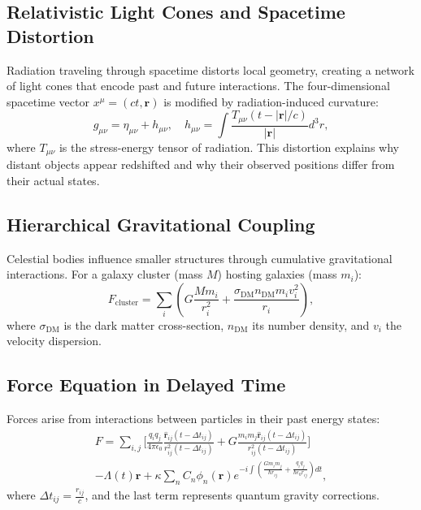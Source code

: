 \documentclass[12pt, a4paper]{article}
\begin{document}
\subsection{Relativistic Light Cones and Spacetime Distortion}
Radiation traveling through spacetime distorts local geometry, creating a network of light cones that encode past and future interactions. The four-dimensional spacetime vector \( x^\mu = (ct, \bm{r}) \) is modified by radiation-induced curvature:
\begin{equation}
g_{\mu\nu} = \eta_{\mu\nu} + h_{\mu\nu}, \quad h_{\mu\nu} = \int \frac{T_{\mu\nu}(t - |\bm{r}|/c)}{|\bm{r}|} d^3r, \label{eq:metric_pert}
\end{equation}
where \( T_{\mu\nu} \) is the stress-energy tensor of radiation. This distortion explains why distant objects appear redshifted and why their observed positions differ from their actual states.

\subsection{Hierarchical Gravitational Coupling}
Celestial bodies influence smaller structures through cumulative gravitational interactions. For a galaxy cluster (mass \( M \)) hosting galaxies (mass \( m_i \)):
\begin{equation}
F_{\text{cluster}} = \sum_i \left( G \frac{M m_i}{r_i^2} + \frac{\sigma_{\text{DM}} n_{\text{DM}} m_i v_i^2}{r_i} \right), \label{eq:hierarchy}
\end{equation}
where \( \sigma_{\text{DM}} \) is the dark matter cross-section, \( n_{\text{DM}} \) its number density, and \( v_i \) the velocity dispersion.

\subsection{Force Equation in Delayed Time}
Forces arise from interactions between particles in their past energy states:
\begin{multline}
F = \sum_{i,j} \Bigg[ \frac{q_i q_j}{4\pi \epsilon_0} \frac{\hat{\bm{r}}_{ij}(t - \Delta t_{ij})}{r_{ij}^2(t - \Delta t_{ij})} + G \frac{m_i m_j \hat{\bm{r}}_{ij}(t - \Delta t_{ij})}{r_{ij}^2(t - \Delta t_{ij})} \Bigg] \\
- \Lambda(t) \bm{r} + \kappa \sum_{n} C_n \phi_n(\bm{r}) e^{-i \int \left( \frac{G m_i m_j}{\hbar r_{ij}} + \frac{q_i q_j}{\hbar \epsilon_0 r_{ij}} \right) dt}, \label{eq:force}
\end{multline}
where \( \Delta t_{ij} = \frac{r_{ij}}{c} \), and the last term represents quantum gravity corrections.
\end{document}
